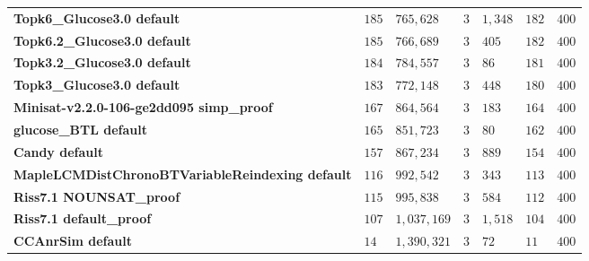\begin{tabular}{lllllll}
\textbf{Topk6_Glucose3.0 default                      } &  $185$ &    $765,628$ &          $3$ &    $1,348$ &          $182$ &  $400$ \\
\textbf{Topk6.2_Glucose3.0 default                    } &  $185$ &    $766,689$ &          $3$ &      $405$ &          $182$ &  $400$ \\
\textbf{Topk3.2_Glucose3.0 default                    } &  $184$ &    $784,557$ &          $3$ &       $86$ &          $181$ &  $400$ \\
\textbf{Topk3_Glucose3.0 default                      } &  $183$ &    $772,148$ &          $3$ &      $448$ &          $180$ &  $400$ \\
\textbf{Minisat-v2.2.0-106-ge2dd095 simp_proof        } &  $167$ &    $864,564$ &          $3$ &      $183$ &          $164$ &  $400$ \\
\textbf{glucose_BTL default                           } &  $165$ &    $851,723$ &          $3$ &       $80$ &          $162$ &  $400$ \\
\textbf{Candy default                                 } &  $157$ &    $867,234$ &          $3$ &      $889$ &          $154$ &  $400$ \\
\textbf{MapleLCMDistChronoBTVariableReindexing default} &  $116$ &    $992,542$ &          $3$ &      $343$ &          $113$ &  $400$ \\
\textbf{Riss7.1 NOUNSAT_proof                         } &  $115$ &    $995,838$ &          $3$ &      $584$ &          $112$ &  $400$ \\
\textbf{Riss7.1 default_proof                         } &  $107$ &  $1,037,169$ &          $3$ &    $1,518$ &          $104$ &  $400$ \\
\textbf{CCAnrSim default                              } &   $14$ &  $1,390,321$ &          $3$ &       $72$ &           $11$ &  $400$ \\
\bottomrule
\end{tabular}
